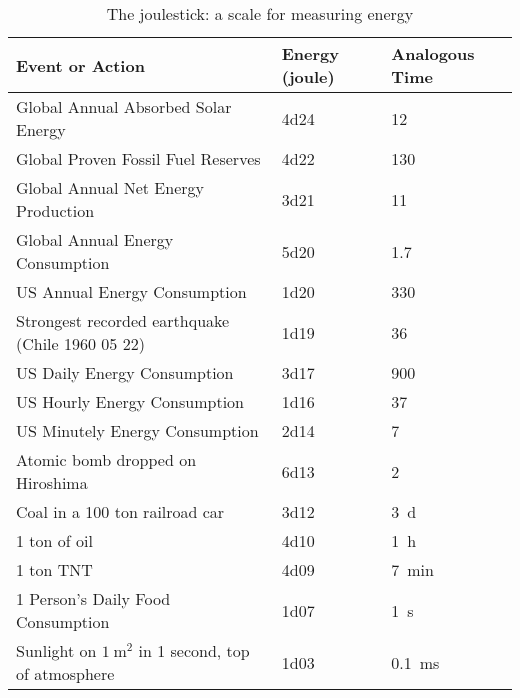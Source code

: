 \documentclass[amstex,12pt]{book}
\begin{document}
\begin{table}
\begin{center}
		\caption{The joulestick: a scale for measuring energy} \label{tab:joulestick}
		\begin{tabular}{@{}lll@{}} \toprule
			Event or Action & Energy (\si{joule}) & Analogous Time\\ \midrule
			Global Annual Absorbed Solar Energy								& \num{4d24}	&\SI{12}{\giga\year}\\
			Global Proven Fossil Fuel Reserves								& \num{4d22}	&\SI{130}{\mega\year}\\
			Global Annual Net Energy Production								& \num{3d21}	&\SI{11}{\mega\year}\\
			Global Annual Energy Consumption	  							& \num{5d20}	&\SI{1.7}{\mega\year}\\
			US Annual Energy Consumption	      							& \num{1d20}	&\SI{330}{\kilo\year}\\
			Strongest recorded earthquake (Chile 1960 05 22)	& \num{1d19}	&\SI{36}{\kilo\year}\\
			US Daily Energy Consumption	        							& \num{3d17}	&\SI{900}{\year}\\
			US Hourly Energy Consumption	      							& \num{1d16}	&\SI{37}{\year}\\
			US Minutely Energy Consumption	    							& \num{2d14}	&\SI{7}{\month}\\
			Atomic bomb dropped on Hiroshima	  							& \num{6d13}	&\SI{2}{\month}\\
			Coal in a 100 ton railroad car	    							& \num{3d12}	&\SI{3}{\day}\\
			1 ton of oil	                      							& \num{4d10}	&\SI{1}{\hour}\\
			1 ton TNT	                          							& \num{4d09}	&\SI{7}{\minute}\\
			1 Person's Daily Food Consumption	  							& \num{1d07}	&\SI{1}{\second}\\
			Sunlight on $\SI{1}{\meter\squared}$ in 1 second, top of atmosphere	  & \num{1d03}	&\SI{0.1}{\milli\second}\\
\bottomrule
\end{tabular}
\end{center}
\end{table}
\end{document}
